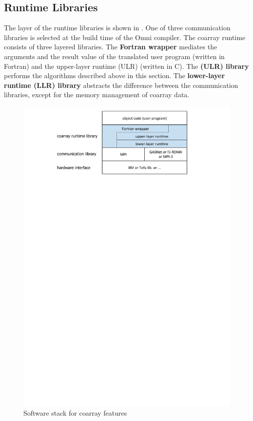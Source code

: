\subsection{Runtime Libraries}\label{sec:runtime}

The layer of the runtime libraries is shown in .
One of three communication libraries is selected 
at the build time of the Omni compiler.
The coarray runtime consists of three layered libraries.
%
The {\bf Fortran wrapper} mediates the arguments and the result value 
of the translated user program (written in Fortran) and the upper-layer runtime (ULR) (written in C).
%
The {\bf (ULR) library} performs the algorithms 
described above in this section.
%
The {\bf lower-layer runtime (LLR) library} abstracts the difference between 
the communication libraries, except for the memory management of coarray data.

\begin{figure}[tbh]
  \begin{center}
    \mbox{\includegraphics[trim=27mm 208mm 29mm 0mm, scale=0.7,clip]{figs/softstack-r4.pdf}}
    \caption{Software stack for coarray features}\label{fig:layer}
  \end{center}
\end{figure}


